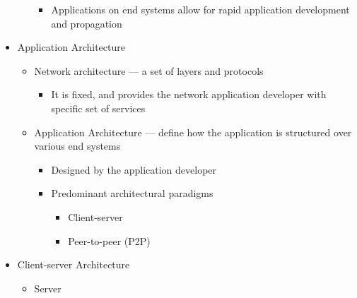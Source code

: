 \begin{itemize}
\begin{itemize}
\begin{itemize}
          \item Applications on end systems allow for rapid application development and propagation

        \end{itemize}

    \end{itemize}

  \item Application Architecture

    \begin{itemize}

      \item Network architecture — a set of layers and protocols

        \begin{itemize}

          \item It is fixed, and provides the network application developer with specific set of services

        \end{itemize}

      \item Application Architecture — define how the application is structured over various end systems

        \begin{itemize}

          \item Designed by the application developer

          \item Predominant architectural paradigms

            \begin{itemize}

              \item Client-server

              \item Peer-to-peer (P2P)

            \end{itemize}

        \end{itemize}

    \end{itemize}

  \item Client-server Architecture

    \begin{itemize}
        
      \item Server


\end{itemize}
\end{itemize}
